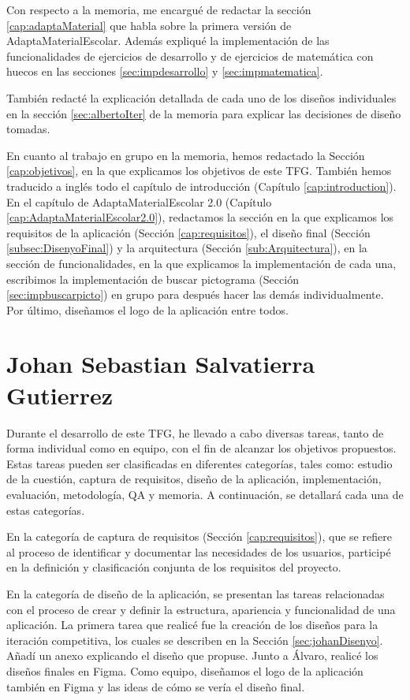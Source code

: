 Con respecto a la memoria, me encargué de redactar la sección \ref{cap:adaptaMaterial} que habla sobre la primera versión de AdaptaMaterialEscolar. Además expliqué la implementación de las funcionalidades de ejercicios de desarrollo y de ejercicios de matemática con huecos en las secciones \ref{sec:impdesarrollo} y \ref{sec:impmatematica}.

También redacté la explicación detallada de cada uno de los diseños individuales en la sección \ref{sec:albertoIter} de la memoria para explicar las decisiones de diseño tomadas.

En cuanto al trabajo en grupo en la memoria, hemos redactado la Sección \ref{cap:objetivos}, en la que explicamos los objetivos de este TFG. También hemos traducido a inglés todo el capítulo de introducción (Capítulo \ref{cap:introduction}). En el capítulo de AdaptaMaterialEscolar 2.0 (Capítulo \ref{cap:AdaptaMaterialEscolar2.0}), redactamos la sección en la que explicamos los requisitos de la aplicación (Sección \ref{cap:requisitos}), el diseño final (Sección \ref{subsec:DisenyoFinal}) y la arquitectura (Sección \ref{sub:Arquitectura}), en la sección de funcionalidades, en la que explicamos la implementación de cada una, escribimos la implementación de buscar pictograma (Sección \ref{sec:impbuscarpicto}) en grupo para después hacer las demás individualmente. Por último, diseñamos el logo de la aplicación entre todos.


\section{Johan Sebastian Salvatierra Gutierrez}
Durante el desarrollo de este TFG, he llevado a cabo diversas tareas, tanto de forma individual como en equipo, con el fin de alcanzar los objetivos propuestos. Estas tareas pueden ser clasificadas en diferentes categorías, tales como: estudio de la cuestión, captura de requisitos, diseño de la aplicación, implementación, evaluación, metodología, QA y memoria. A continuación, se detallará cada una de estas categorías.

En la categoría de captura de requisitos (Sección \ref{cap:requisitos}), que se refiere al proceso de identificar y documentar las necesidades de los usuarios, participé en la definición y clasificación conjunta de los requisitos del proyecto.

En la categoría de diseño de la aplicación, se presentan las tareas relacionadas con el proceso de crear y definir la estructura, apariencia y funcionalidad de una aplicación. La primera tarea que realicé fue la creación de los diseños para la iteración competitiva, los cuales se describen en la Sección \ref{sec:johanDisenyo}. Añadí un anexo explicando el diseño que propuse. Junto a Álvaro, realicé los diseños finales en Figma. Como equipo, diseñamos el logo de la aplicación también en Figma y las ideas de cómo se vería el diseño final.

